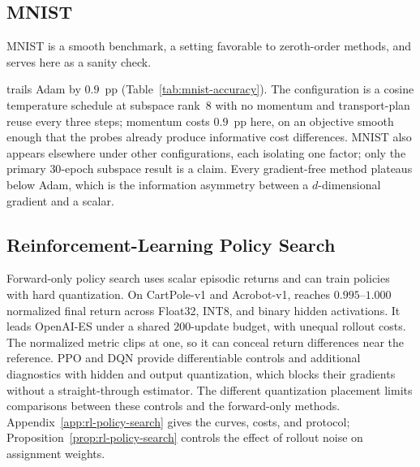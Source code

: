 \subsection{MNIST}\label{sec:vision}

MNIST is a smooth benchmark, a setting favorable to zeroth-order methods, and serves here as a sanity check.

\begin{table}[t]
\caption{MNIST test accuracy (\%, 5 seeds, mean $\pm$ std at the validation-selected checkpoint), with both cost axes and the axis each row was budgeted on; best gradient-free result in bold.}
\label{tab:mnist-accuracy}
\centering
\small

\end{table}

\sysname{} trails Adam by $0.9$~pp (Table~\ref{tab:mnist-accuracy}). The configuration is a cosine temperature schedule at
subspace rank~8 with no momentum and transport-plan reuse every three steps; momentum
costs $0.9$~pp here, on an objective smooth enough that the probes already produce
informative cost differences. MNIST also appears elsewhere under other configurations,
each isolating one factor; only the primary $30$-epoch subspace result is a claim.
Every gradient-free method plateaus below Adam, which is the information asymmetry
between a $d$-dimensional gradient and a scalar.

\subsection{Reinforcement-Learning Policy Search}\label{sec:rl-policy-search}

Forward-only policy search uses scalar episodic returns and can train
policies with hard quantization. On CartPole-v1 and Acrobot-v1,
\sysname{} reaches $0.995$--$1.000$ normalized final return across Float32,
INT8, and binary hidden activations. It leads OpenAI-ES under a shared
$200$-update budget, with unequal rollout costs. The normalized metric
clips at one, so it can conceal return differences near the reference.
PPO and DQN provide differentiable controls and additional diagnostics
with hidden and output quantization, which blocks their gradients without
a straight-through estimator. The different quantization placement limits
comparisons between these controls and the forward-only methods.
Appendix~\ref{app:rl-policy-search} gives the curves, costs, and protocol;
Proposition~\ref{prop:rl-policy-search} controls the effect of rollout
noise on assignment weights.


